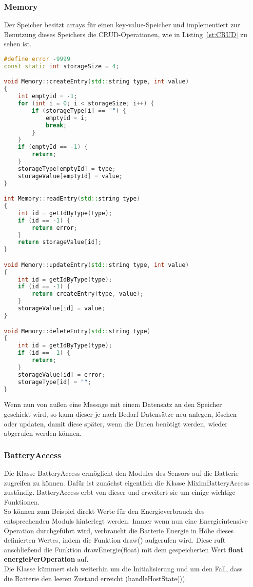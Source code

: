 \subsubsection{Memory}

Der Speicher besitzt arrays für einen key-value-Speicher und implementiert zur Benutzung dieses Speichers die CRUD-Operationen, wie in Listing \ref{lst:CRUD} zu sehen ist.

\begin{lstlisting}[language=C++, label=lst:CRUD]
#define error -9999
const static int storageSize = 4;

void Memory::createEntry(std::string type, int value)
{
    int emptyId = -1;
    for (int i = 0; i < storageSize; i++) {
        if (storageType[i] == "") {
            emptyId = i;
            break;
        }
    }
    if (emptyId == -1) {
        return;
    }
    storageType[emptyId] = type;
    storageValue[emptyId] = value;
}

int Memory::readEntry(std::string type)
{
    int id = getIdByType(type);
    if (id == -1) {
        return error;
    }
    return storageValue[id];
}

void Memory::updateEntry(std::string type, int value)
{
    int id = getIdByType(type);
    if (id == -1) {
        return createEntry(type, value);
    }
    storageValue[id] = value;
}

void Memory::deleteEntry(std::string type)
{
    int id = getIdByType(type);
    if (id == -1) {
        return;
    }
    storageValue[id] = error;
    storageType[id] = "";
}
\end{lstlisting}

Wenn nun von außen eine Message mit einem Datensatz an den Speicher geschickt wird, so kann dieser je nach Bedarf Datensätze neu anlegen, löschen oder updaten, damit diese später, wenn die Daten benötigt werden, wieder abgerufen werden können.

\subsubsection{BatteryAccess}

Die Klasse BatteryAccess ermöglicht den Modules des Sensors auf die Batterie zugreifen zu können. Dafür ist zunächst eigentlich die Klasse MiximBatteryAccess zuständig. BatteryAccess erbt von dieser und erweitert sie um einige wichtige Funktionen.\\
So können zum Beispiel direkt Werte für den Energieverbrauch des entsprechenden Moduls hinterlegt werden. Immer wenn nun eine Energieintensive Operation durchgeführt wird, verbraucht die Batterie Energie in Höhe dieses definierten Wertes, indem die Funktion draw() aufgerufen wird. Diese ruft anschließend die Funktion drawEnergie(float) mit dem gespeicherten Wert \textbf{float energiePerOperation} auf.\\
Die Klasse kümmert sich weiterhin um die Initialisierung und um den Fall, dass die Batterie den leeren Zustand erreicht (handleHostState()).

